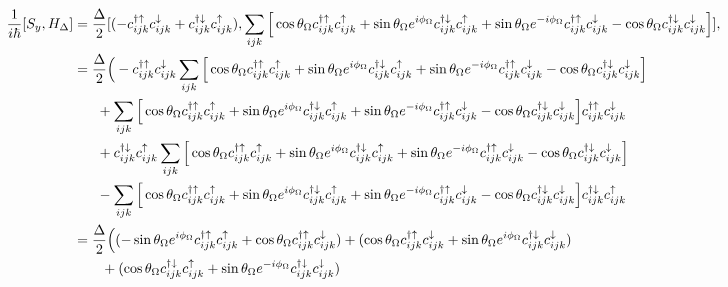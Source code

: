 \documentclass[10pt,prb,showpacs,amssymb,floatfix]{revtex4-1}
\newcommand{\dg}{\dagger}
\newcommand{\dna}{\downarrow}
\newcommand{\nn}{\nonumber}
\newcommand{\upa}{\uparrow}
\newcommand{\Dlt}{\Delta}
\newcommand{\Og}{\Omega}
\begin{document}
\begin{align}
\frac{1}{i\hbar}[S_y, H_\Dlt] &=  \frac{\Dlt}{2} [ (-c_{ijk}^{\dg\upa} c_{ijk}^{\dna} + c_{ijk}^{\dg\dna} c_{ijk}^{\upa}), \sum_{ijk} \Big{[} \cos\theta_\Og c_{ijk}^{\dagger \uparrow} c_{ijk}^\uparrow +  \sin\theta_\Og e^{i\phi_\Og} c_{ijk}^{\dagger \downarrow} c_{ijk}^\uparrow+  \sin\theta_\Og e^{-i\phi_\Og} c_{ijk}^{\dagger \uparrow} c_{ijk}^\downarrow - \cos\theta_\Og  c_{ijk}^{\dagger \downarrow} c_{ijk}^\downarrow  \Big{]}], \nn\\
&=  \frac{\Dlt}{2} \Big{(} -c_{ijk}^{\dg\upa} c_{ijk}^{\dna} \sum_{ijk} \Big{[} \cos\theta_\Og c_{ijk}^{\dagger \uparrow} c_{ijk}^\uparrow +  \sin\theta_\Og e^{i\phi_\Og} c_{ijk}^{\dagger \downarrow} c_{ijk}^\uparrow+  \sin\theta_\Og e^{-i\phi_\Og} c_{ijk}^{\dagger \uparrow} c_{ijk}^\downarrow - \cos\theta_\Og  c_{ijk}^{\dagger \downarrow} c_{ijk}^\downarrow  \Big{]}   \nn\\ 
& ~~~~~  +   \sum_{ijk} \Big{[} \cos\theta_\Og c_{ijk}^{\dagger \uparrow} c_{ijk}^\uparrow +  \sin\theta_\Og e^{i\phi_\Og} c_{ijk}^{\dagger \downarrow} c_{ijk}^\uparrow+  \sin\theta_\Og e^{-i\phi_\Og} c_{ijk}^{\dagger \uparrow} c_{ijk}^\downarrow - \cos\theta_\Og  c_{ijk}^{\dagger \downarrow} c_{ijk}^\downarrow  \Big{]} c_{ijk}^{\dg\upa} c_{ijk}^{\dna} \nn\\
& ~~~~~ + c_{ijk}^{\dg\dna} c_{ijk}^{\upa} \sum_{ijk} \Big{[} \cos\theta_\Og c_{ijk}^{\dagger \uparrow} c_{ijk}^\uparrow +  \sin\theta_\Og e^{i\phi_\Og} c_{ijk}^{\dagger \downarrow} c_{ijk}^\uparrow+  \sin\theta_\Og e^{-i\phi_\Og} c_{ijk}^{\dagger \uparrow} c_{ijk}^\downarrow - \cos\theta_\Og  c_{ijk}^{\dagger \downarrow} c_{ijk}^\downarrow  \Big{]} \nn\\
& ~~~~~ - \sum_{ijk} \Big{[} \cos\theta_\Og c_{ijk}^{\dagger \uparrow} c_{ijk}^\uparrow +  \sin\theta_\Og e^{i\phi_\Og} c_{ijk}^{\dagger \downarrow} c_{ijk}^\uparrow+  \sin\theta_\Og e^{-i\phi_\Og} c_{ijk}^{\dagger \uparrow} c_{ijk}^\downarrow - \cos\theta_\Og  c_{ijk}^{\dagger \downarrow} c_{ijk}^\downarrow  \Big{]} c_{ijk}^{\dg\dna} c_{ijk}^{\upa} \nn\\
&=  \frac{\Dlt}{2} \Big{(} ( -\sin\theta_\Og e^{i\phi_\Og} c_{ijk}^{\dg\upa} c_{ijk}^{\upa}   + \cos\theta_\Og  c_{ijk}^{\dg\upa} c_{ijk}^{\dna} ) + (\cos\theta_\Og c_{ijk}^{\dagger \uparrow} c_{ijk}^\dna +  \sin\theta_\Og e^{i\phi_\Og} c_{ijk}^{\dagger \downarrow} c_{ijk}^\dna) \nn\\
& ~~~~~~+ ( \cos\theta_\Og c_{ijk}^{\dagger \dna} c_{ijk}^\uparrow +  \sin\theta_\Og e^{-i\phi_\Og} c_{ijk}^{\dagger \dna} c_{ijk}^\dna)

\end{align}
\end{document}
